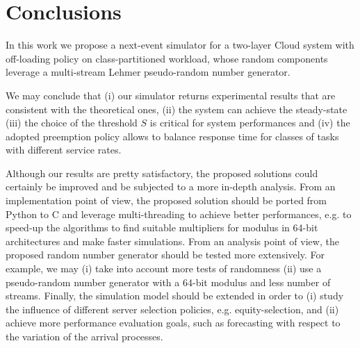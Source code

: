 \section{Conclusions}
\label{sec:conclusions}

In this work we propose a next-event simulator for a two-layer Cloud system with off-loading policy on class-partitioned workload, whose random components leverage a multi-stream Lehmer pseudo-random number generator.

We may conclude that (i) our simulator returns experimental results that are consistent with the theoretical ones, (ii) the system can achieve the steady-state (iii) the choice of the threshold $S$ is critical for system performances and (iv) the adopted preemption policy allows to balance response time for classes of tasks with different service rates. 

Although our results are pretty satisfactory, the proposed solutions could certainly be improved and be subjected to a more in-depth analysis.
%
From an implementation point of view, the proposed solution should be ported from Python to C and leverage multi-threading to achieve better performances, e.g. to speed-up the algorithms to find suitable multipliers for modulus in 64-bit architectures and make faster simulations.
%
From an analysis point of view, the proposed random number generator should be tested more extensively. For example, we may (i) take into account more tests of randomness (ii) use a pseudo-random number generator with a 64-bit modulus and less number of streams.
%
Finally, the simulation model should be extended in order to 
(i) study the influence of different server selection policies, e.g. equity-selection, and 
(ii) achieve more performance evaluation goals, such as forecasting with respect to the variation of the arrival processes.
